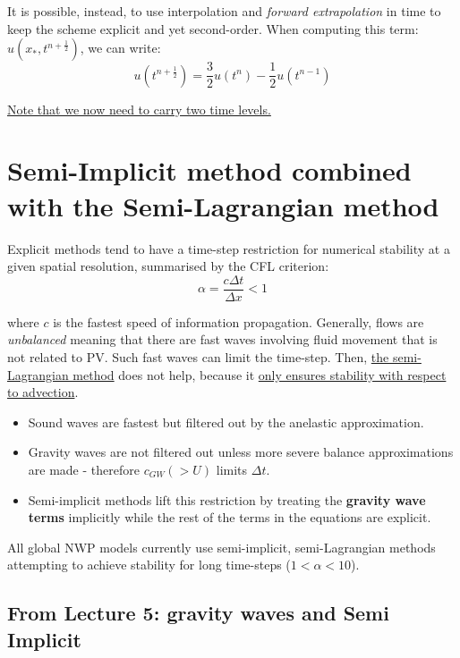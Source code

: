 	It is possible, instead, to use interpolation and \emph{forward extrapolation} in time to keep the scheme explicit and yet second-order. When computing this term: $u(x_*,t^{n+\frac{1}{2}})$, we can write:
	\begin{equation}
	u(t^{n+\frac{1}{2}})=\frac{3}{2}u(t^n)-\frac{1}{2}u(t^{n-1})
	\end{equation}
	
	\underline{Note that we now need to carry two time levels.}
	

\section{Semi-Implicit method combined with the Semi-Lagrangian method}

Explicit methods tend to have a time-step restriction for numerical
stability at a given spatial resolution, summarised by the CFL criterion:
\[
\alpha=\frac{c \Delta t}{\Delta x}< 1
\]

where $c$ is the fastest speed of information propagation. Generally,
flows are {\em unbalanced} meaning that there are fast waves involving
fluid movement that is not related to PV. Such fast waves can limit
the time-step. Then, \underline{the semi-Lagrangian method} does not
help, because it \underline{only ensures stability with respect to advection}.

\begin{itemize}
\item
Sound waves are fastest but filtered out by the anelastic
approximation.

\item
Gravity waves are not filtered out unless more severe balance
approximations are made - therefore $c_{GW} (> U)$ limits $\Delta t$.

\item
Semi-implicit methods lift this restriction by treating the {\bf
gravity wave terms} implicitly while the rest of the terms in the equations are
explicit.
\end{itemize}

All global NWP models currently use semi-implicit, semi-Lagrangian
methods attempting to achieve stability for long time-steps ($1 < \alpha <
10$).


\subsection{From Lecture 5: gravity waves and Semi Implicit}

